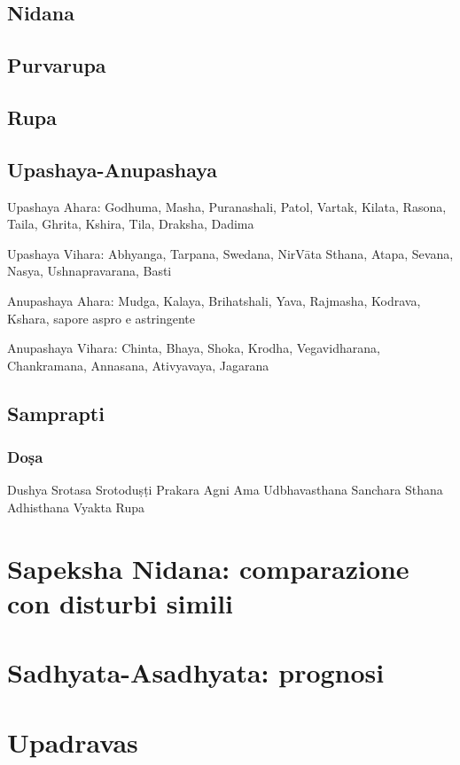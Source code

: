 \subsection{Nidana}

\subsection{Purvarupa}

\subsection{Rupa}

\subsection{Upashaya-Anupashaya}

     Upashaya Ahara: Godhuma, Masha, Puranashali, Patol, Vartak, Kilata, Rasona, Taila, Ghrita, Kshira, Tila, Draksha, Dadima 

     Upashaya Vihara: Abhyanga, Tarpana, Swedana, NirV\={a}ta Sthana, Atapa, Sevana, Nasya, Ushnapravarana, Basti

     Anupashaya Ahara: Mudga, Kalaya, Brihatshali, Yava, Rajmasha, Kodrava, Kshara, sapore aspro e astringente 

     Anupashaya Vihara: Chinta, Bhaya, Shoka, Krodha, Vegavidharana, Chankramana, Annasana, Ativyavaya, Jagarana


\subsection{Samprapti}


\subsubsection{Do\d{s}a
}

   
   Dushya
   Srotasa
   Srotodu\d{s}\d{t}i
 Prakara
   Agni
   Ama
   Udbhavasthana
   Sanchara Sthana
   Adhisthana
   Vyakta Rupa


\section{Sapeksha Nidana: comparazione con disturbi simili}
 
\section{Sadhyata-Asadhyata: prognosi}

\section{Upadravas}


